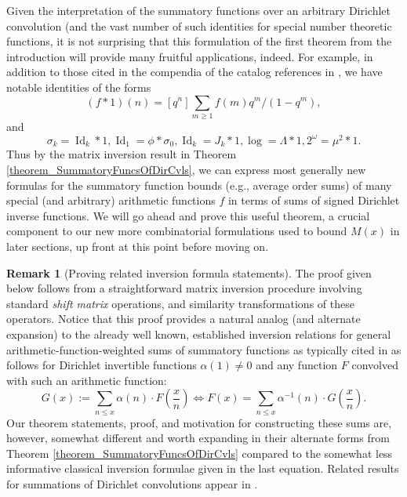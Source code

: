 \documentclass[11pt,reqno,a4letter]{article}
\numberwithin{figure}{section}
\numberwithin{table}{section}
\newcommand{\cf}{\textit{cf.\ }}
\newcommand{\floor}[1]{\left\lfloor #1 \right\rfloor}
\theoremstyle{plain}
\numberwithin{theorem}{section}
\theoremstyle{definition}
\newtheorem{remark}[theorem]{Remark}
\begin{document}
Given the interpretation of the summatory functions over an arbitrary Dirichlet convolution 
(and the vast number of such identities for special number theoretic functions, 
it is not surprising that this formulation of the first theorem from the introduction 
will provide many fruitful applications, indeed. For example, in addition to those cited in the 
compendia of the catalog references in \cite{CATALOG-INTDIRSERIES,CATALOG-LAMBERTSERIES}, 
we have notable identities of the forms  
$$(f \ast 1)(n) = [q^n] \sum_{m \geq 1} f(m) q^m / (1-q^m),$$ and  
$$\sigma_k = \operatorname{Id}_k \ast 1, \operatorname{Id}_1 = \phi \ast \sigma_0, 
\operatorname{Id}_k = J_k \ast 1, \log = \Lambda \ast 1, 
2^{\omega} = \mu^2 \ast 1.$$ 
Thus by the matrix inversion result in Theorem \ref{theorem_SummatoryFuncsOfDirCvls}, we can express most generally 
new formulas for the summatory function bounds (e.g., average order sums) of many special (and arbitrary) arithmetic 
functions $f$ in terms of sums of signed Dirichlet inverse functions. 
We will go ahead and prove this useful theorem, a crucial component to our new more combinatorial 
formulations used to bound $M(x)$ in later sections, up front at this point before moving on. 

\begin{remark}[Proving related inversion formula statements] 
The proof given below follows from a straightforward matrix inversion 
procedure involving standard \emph{shift matrix} operations, and similarity transformations of these operators. 
Notice that this proof provides a natural analog (and alternate expansion) to the already 
well known, established inversion relations for 
general arithmetic-function-weighted sums of summatory functions as typically cited in 
\cite[\S 2.14]{APOSTOLANUMT} as follows for Dirichlet invertible functions $\alpha(1) \neq 0$ and any 
function $F$ convolved with such an arithmetic function: 
\[ 
G(x) := \sum_{n \leq x} \alpha(n) \cdot F\left(\frac{x}{n}\right) \iff  
     F(x) = \sum_{n \leq x} \alpha^{-1}(n) \cdot G\left(\frac{x}{n}\right). 
\]
Our theorem statements, proof, and motivation for constructing these sums are, however, somewhat different and 
worth expanding in their alternate forms from Theorem \ref{theorem_SummatoryFuncsOfDirCvls} 
compared to the somewhat less informative classical inversion formulae given in the last equation. 
Related results for summations of Dirichlet convolutions appear in 
\cite[\S 3.10; \S 3.12; \cf \S 4.9, p.\ 95]{APOSTOLANUMT}. 
\end{remark} 
\end{document}
